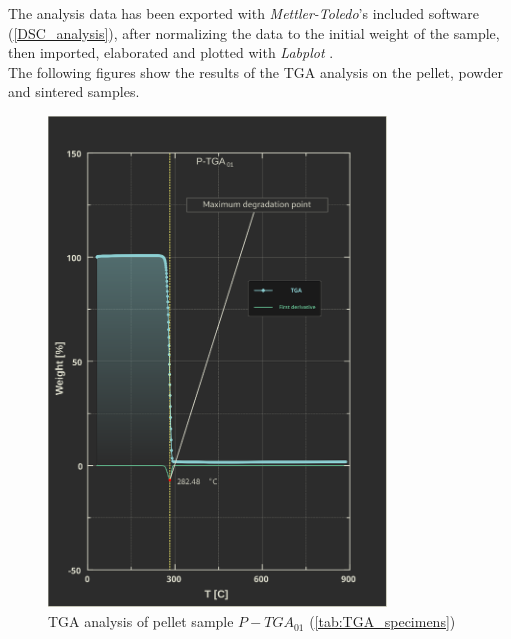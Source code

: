 \documentclass{article}
\begin{document}
            The analysis data has been exported with \textit{Mettler-Toledo}'s included software \autocites{Mettler_Toledo} (\ref{DSC_analysis}), after normalizing the data to the initial weight of the sample,
            then imported, elaborated and plotted with \textit{Labplot} \autocites{Labplot}. \\

            The following figures show the results of the TGA analysis on the pellet, powder and sintered samples. \\ 

            \begin{figure}[h!]
                \centering
                \includegraphics[width=0.8\textwidth]{Pictures/Thermal_analysis_plots/TGA_catalogued/P-TGA01.eps}
                \caption{TGA analysis of pellet sample $P-TGA_{01}$ (\ref{tab:TGA_specimens})}
                \label{fig:TGA_01}
            \end{figure}
\end{document}
